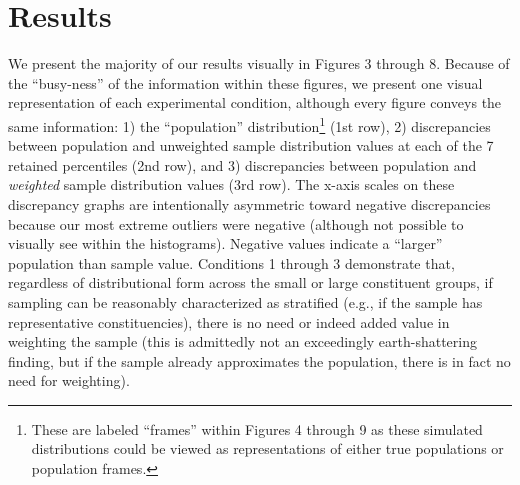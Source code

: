 \documentclass[
  ,man]{apa7}
\begin{document}
\hypertarget{results}{%
\section{Results}\label{results}}

We present the majority of our results visually in Figures 3 through 8. Because of the ``busy-ness'' of the information within these figures, we present one visual representation of each experimental condition, although every figure conveys the same information: 1) the ``population'' distribution\footnote{These are labeled ``frames'' within Figures 4 through 9 as these simulated distributions could be viewed as representations of either true populations or population frames.} (1st row), 2) discrepancies between population and unweighted sample distribution values at each of the 7 retained percentiles (2nd row), and 3) discrepancies between population and \emph{weighted} sample distribution values (3rd row). The x-axis scales on these discrepancy graphs are intentionally asymmetric toward negative discrepancies because our most extreme outliers were negative (although not possible to visually see within the histograms). Negative values indicate a ``larger'' population than sample value. Conditions 1 through 3 demonstrate that, regardless of distributional form across the small or large constituent groups, if sampling can be reasonably characterized as stratified (e.g., if the sample has representative constituencies), there is no need or indeed added value in weighting the sample (this is admittedly not an exceedingly earth-shattering finding, but if the sample already approximates the population, there is in fact no need for weighting).
\end{document}
